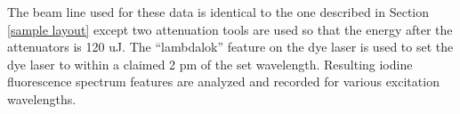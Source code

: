 The beam line used for these data is identical to the one described in Section \ref{sample layout} except two attenuation tools are used so that the energy after the attenuators is 120 uJ. The ``lambdalok'' feature on the dye laser is used to set the dye laser to within a claimed 2 pm of the set wavelength. Resulting iodine fluorescence spectrum features are analyzed and recorded for various excitation wavelengths.
